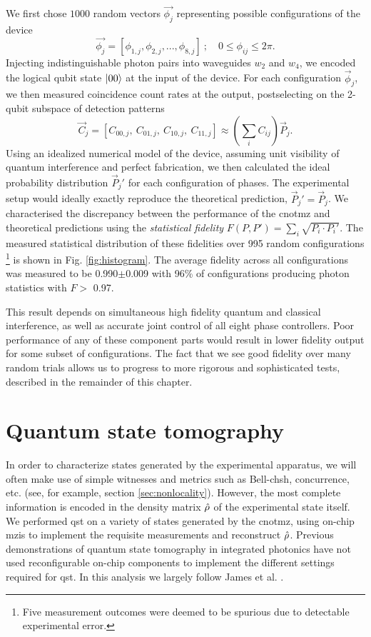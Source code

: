 We first chose $1000$ random vectors $\vec{\phi_{j}}$ representing possible configurations of the device
\begin{equation}
\vec{\phi_{j}} = \left [ \phi_{1, j}, \phi_{2, j},...,\phi_{8, j}\right]
~; \quad 
0\le\phi_{ij}\le2\pi.
\end{equation}
Injecting indistinguishable photon pairs into waveguides $w_2$ and $w_4$, we encoded the logical qubit state $\mbox{$ | 00 \rangle $}$ at the input of the device. For each configuration $\vec{\phi}_j$, we then measured coincidence count rates at the output, postselecting on the 2-qubit subspace of detection patterns 
\begin{equation}
   \vec{C}_j = \left[ C_{00,j},~C_{01,j},~C_{10,j},~C_{11,j}  \right]
   \approx \left(\sum_i{C_{ij}}\right) \vec{P}_{j}.
\end{equation}
Using an idealized numerical model of the device, assuming unit visibility of quantum interference and perfect fabrication, we then calculated the ideal probability distribution 
$\vec{P}_{j}'$ for each configuration of phases. The experimental setup would ideally exactly reproduce the theoretical prediction, $\vec{P}_{j}' = \vec{P}_{j}$. We characterised the discrepancy between the performance of the \gls{cnotmz} and theoretical predictions using the \emph{statistical fidelity} $F(P, P')=\sum_{i}\sqrt{P_{i}\cdot P_{i}'}$.  The measured statistical distribution of these fidelities over 995 random configurations \footnote{Five measurement outcomes were deemed to be spurious due to detectable experimental error.} is shown in Fig. \ref{fig:histogram}. 
The average fidelity across all configurations was measured to be 0.990$\pm$0.009 with 96\% of configurations producing photon statistics with $F >$ 0.97. 

This result depends on simultaneous high fidelity quantum and classical interference, as well as accurate joint control of all eight phase controllers. Poor performance of any of these component parts would result in lower fidelity output for some subset of 
configurations. The fact that we see good fidelity over many random trials allows us to progress to more rigorous and sophisticated tests, described in the remainder of this chapter.

\section{Quantum state tomography} 
\label{sec:state-tomography}
In order to characterize states generated by the experimental apparatus, we will often make use of simple witnesses and metrics such as Bell-\acrshort{chsh}, concurrence, etc. (see,  for example, section \ref{sec:nonlocality}). However, the most complete information is encoded in the density matrix $\hat{\rho}$ of the experimental state itself. We performed \gls{qst} on a variety of states generated by the \gls{cnotmz}, using on-chip \glspl{mzi} to implement the requisite measurements and reconstruct $\hat{\rho}$. Previous demonstrations of quantum state tomography in integrated photonics have not used reconfigurable on-chip components to implement the different settings required for \gls{qst}.
In this analysis we largely follow James et al. \cite{James2001}.

